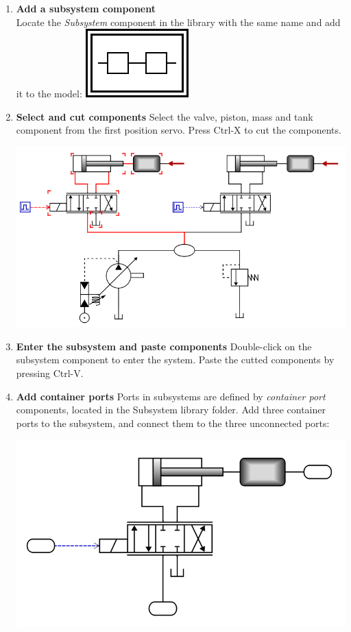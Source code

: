 \documentclass[a4paper,pdftex]{article}
\begin{document}
\begin{enumerate}
\item \textbf{Add a subsystem component} \\
Locate the \textit{Subsystem} component in the library with the same name and add it to the model:
\includegraphics{gfx/advancedusage/subsystem.pdf}

\item\textbf{Select and cut components}
Select the valve, piston, mass and tank component from the first position servo. Press Ctrl-X to cut the components.

\includegraphics[width=0.8\linewidth]{gfx/advancedusage/componentsforsubsystem.png}

\item\textbf{Enter the subsystem and paste components}
Double-click on the subsystem component to enter the system. Paste the cutted components by pressing Ctrl-V.

\item\textbf{Add container ports}
Ports in subsystems are defined by \textit{container port} components, located in the Subsystem library folder. Add three container ports to the subsystem, and connect them to the three unconnected ports:

\includegraphics[width=0.6\linewidth]{gfx/advancedusage/systemports.png}


\end{enumerate}
\end{document}
